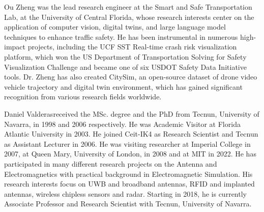 \documentclass[lettersize,journal]{IEEEtran}
\begin{document}
\vspace{11pt}

\begin{IEEEbiography}{Ou Zheng} was the lead research engineer at the Smart and Safe Transportation Lab, at the University of Central Florida, whose research interests center on the application of computer vision, digital twins, and large language model techniques to enhance traffic safety. He has been instrumental in numerous high-impact projects, including the UCF SST Real-time crash risk visualization platform, which won the US Department of Transportation Solving for Safety Visualization Challenge and became one of six USDOT Safety Data Initiative tools. Dr. Zheng has also created CitySim, an open-source dataset of drone video vehicle trajectory and digital twin environment, which has gained significant recognition from various research fields worldwide.
\end{IEEEbiography}

\vspace{11pt}

\begin{IEEEbiography}{Daniel Valderas}received the MSc. degree and the PhD from Tecnun, University of Navarra, in 1998 and 2006 respectively. He was Academic Visitor at Florida Atlantic University in 2003. He joined Ceit-IK4 as Research Scientist and Tecnun as Assistant Lecturer in 2006. He was visiting researcher at Imperial College in 2007, at Queen Mary, University of London, in 2008 and at MIT in 2022. He has participated in many different research projects on the Antenna and Electromagnetics with practical background in Electromagnetic Simulation. His research interests focus on UWB and broadband antennas, RFID and implanted antennas, wireless chipless sensors and radar. Starting in 2018, he is currently Associate Professor and Research Scientist with Tecnun, University of Navarra.
\end{IEEEbiography}

\vspace{11pt}
\end{document}
